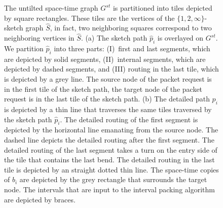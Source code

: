 \documentclass[11pt]{article}
\newenvironment{proof sketch}[1]{\noindent {\emph{Proof sketch of #1:}}}{\hfill \qed}
\begin{document}
\begin{figure}
  \centering
  \qquad
  \caption{The untilted space-time graph $G^{st}$ is partitioned into tiles depicted by square rectangles. These tiles are the vertices of the $\{1,2,\infty\}$-sketch graph $\hat S$, in fact, two neighboring squares correspond to two neighboring vertices in $\hat S$. (a) The sketch path $\hat{p}_i$ is overlayed on $G^{st}$. We partition $\hat{p}_i$ into three parts: (I)~first and last segments, which are depicted by solid segments, (II)~internal segments, which are depicted by dashed segments, and (III) routing in the last tile, which is depicted by a grey line. The source node of the packet request is in the first tile of the sketch path, the target node of the packet request is in the last tile of the sketch path. (b) The detailed path $p_i$ is depicted by a thin line that traverses the same tiles traversed by the sketch path $\hat{p}_i$. The detailed routing  of the first segment is depicted by the horizontal line emanating from the source  node. The dashed line depicts the detailed routing after the first segment. The detailed routing of the last segment takes a turn on the entry side of the tile that contains the last bend. The detailed routing in the last tile is depicted by an straight dotted thin line.  The space-time copies of $b_i$ are depicted by the grey rectangle that surrounds the target node.
  The intervals that are input to the interval packing algorithm are depicted by braces.}
  \label{fig:ddetail}
\end{figure}
\end{document}

